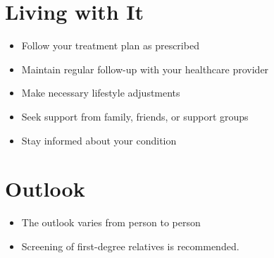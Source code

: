 \section{Living with It}
\begin{itemize}[noitemsep]
  \item Follow your treatment plan as prescribed
  \item Maintain regular follow-up with your healthcare provider
  \item Make necessary lifestyle adjustments
  \item Seek support from family, friends, or support groups
  \item Stay informed about your condition
\end{itemize}
\section{Outlook}
\begin{itemize}[noitemsep]
  \item The outlook varies from person to person
  \item Screening of first-degree relatives is recommended.
\end{itemize}

